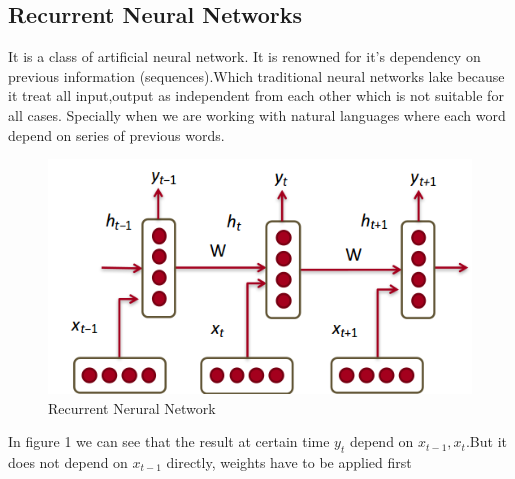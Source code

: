 \documentclass{article}
\begin{document}
\begin{multicols*}{2}
\begin{flushleft}
\subsection{Recurrent Neural Networks}
It is a class of artificial neural network. It is renowned for it's dependency on previous information (sequences).\cite{5}\cite{6}Which traditional neural networks lake because it treat all input,output as independent from each other which is not suitable for all cases.\cite{6} Specially when we are working with natural languages where each word depend on series of previous words. 
\begin{figure}[H]
\centering
\includegraphics[scale=0.4]{RNN.png}
\caption{Recurrent Nerural Network}
\end{figure}
In figure 1 we can see that the result at certain time \(y_t\) depend on \(x_{t-1},x_t\).But it does not depend on \(x_{t-1}\) directly, weights have to be applied first

\end{flushleft}
\end{multicols*}
\end{document}
